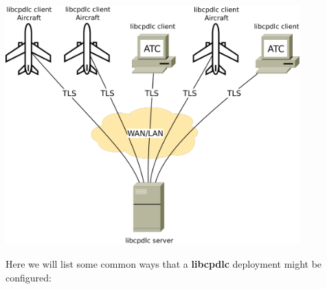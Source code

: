 \documentclass[a4paper,12pt]{article}
\newcommand{\libcpdlc}{\textbf{libcpdlc}\xspace}
\begin{document}
\begin{center}
\includegraphics[width=0.85\textwidth]{base_network.png}
\end{center}

\noindent Here we will list some common ways that a \libcpdlc deployment
might be configured:
\end{document}
